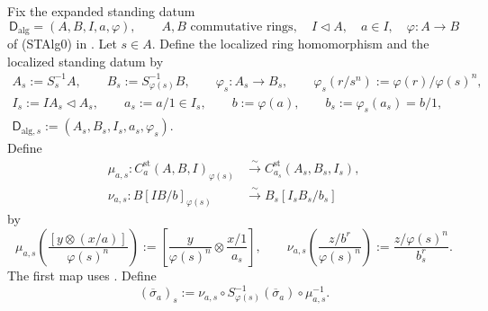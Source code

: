 \begin{definition}
  \label{def:nagata-strict-transform-chart-comparison-localized}

  Fix the expanded standing datum
  \[
    \mathsf D_{\mathrm{alg}}=(A,B,I,a,\varphi),\qquad
    A,B\text{ commutative rings},\quad
    I\triangleleft A,\quad a\in I,\quad
    \varphi\colon A\to B
  \]
  of (STAlg0) in
  .
  Let $s\in A$.  Define the localized ring homomorphism and the localized
  standing datum by
  \[
  \begin{gathered}
    A_s:=S_s^{-1}A,\qquad
    B_s:=S_{\varphi(s)}^{-1}B,\qquad
    \varphi_s\colon A_s\to B_s,\qquad
    \varphi_s(r/s^n):=\varphi(r)/\varphi(s)^n,\\
    I_s:=IA_s\triangleleft A_s,\qquad
    a_s:=a/1\in I_s,\qquad
    b:=\varphi(a),\qquad
    b_s:=\varphi_s(a_s)=b/1,\\
    \mathsf D_{\mathrm{alg},s}
      :=(A_s,B_s,I_s,a_s,\varphi_s).
  \end{gathered}                                                     \tag{STAlg1}
  \]
  Define
  \[
  \begin{aligned}
    \mu_{a,s}\colon
      C_a^{\mathrm{st}}(A,B,I)_{\varphi(s)}
        &\xrightarrow{\sim}C_{a_s}^{\mathrm{st}}(A_s,B_s,I_s),\\
    \nu_{a,s}\colon
      B[IB/b]_{\varphi(s)}
        &\xrightarrow{\sim}B_s[I_sB_s/b_s]
  \end{aligned}
  \]
  by
  \[
    \mu_{a,s}\left(
      \frac{[y\otimes(x/a)]}{\varphi(s)^n}\right)
      :=\left[\frac y{\varphi(s)^n}\otimes\frac{x/1}{a_s}\right],
    \qquad
    \nu_{a,s}\left(\frac{z/b^r}{\varphi(s)^n}\right)
      :=\frac{z/\varphi(s)^n}{b_s^r}.
  \]
  The first map uses
  .  Define
  \[
    (\overline\sigma_a)_s
      :=\nu_{a,s}\circ
        S_{\varphi(s)}^{-1}(\overline\sigma_a)\circ\mu_{a,s}^{-1}.
  \]
\end{definition}

